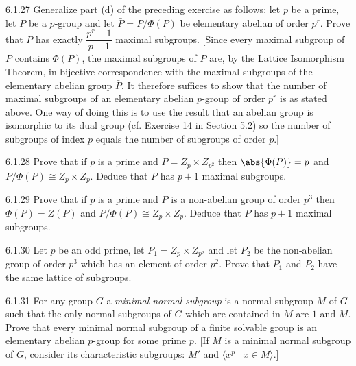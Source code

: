 \begin{exercise}{6.1.27}
    Generalize part (d) of the preceding exercise as follows: let $p$ be a prime, let $P$ be a $p$-group and let $\bar{P} = P/\Phi(P)$ be elementary abelian of order $p^r$.
    Prove that $P$ has exactly $\dfrac{p^r - 1}{p - 1}$ maximal subgroups.
    [Since every maximal subgroup of $P$ contains $\Phi(P)$, the maximal subgroups of $P$ are, by the Lattice Isomorphism Theorem, in bijective correspondence with the maximal subgroups of the elementary abelian group $\bar{P}$.
    It therefore suffices to show that the number of maximal subgroups of an elementary abelian $p$-group of order $p^r$ is as stated above.
    One way of doing this is to use the result that an abelian group is isomorphic to its dual group (cf. Exercise 14 in Section 5.2) so the number of subgroups of index $p$ equals the number of subgroups of order $p$.]
\end{exercise}

\begin{exercise}{6.1.28}
    Prove that if $p$ is a prime and $P = Z_p \times Z_{p^2}$ then $\abs{\Phi(P)} = p$ and $P/\Phi(P) \cong Z_p \times Z_p$.
    Deduce that $P$ has $p+1$ maximal subgroups.
\end{exercise}

\begin{exercise}{6.1.29}
    Prove that if $p$ is a prime and $P$ is a non-abelian group of order $p^3$ then $\Phi(P) = Z(P)$ and $P/\Phi(P) \cong Z_p \times Z_p$.
    Deduce that $P$ has $p+1$ maximal subgroups.
\end{exercise}

\begin{exercise}{6.1.30}
    Let $p$ be an odd prime, let $P_1 = Z_p \times Z_{p^2}$ and let $P_2$ be the non-abelian group of order $p^3$ which has an element of order $p^2$.
    Prove that $P_1$ and $P_2$ have the same lattice of subgroups.
\end{exercise}

\begin{exercise}{6.1.31}
    For any group $G$ a \emph{minimal normal subgroup} is a normal subgroup $M$ of $G$ such that the only normal subgroups of $G$ which are contained in $M$ are $1$ and $M$.
    Prove that every minimal normal subgroup of a finite solvable group is an elementary abelian $p$-group for some prime $p$.
    [If $M$ is a minimal normal subgroup of $G$, consider its characteristic subgroups: $M'$ and $\langle x^p \mid x \in M \rangle$.]
\end{exercise}


